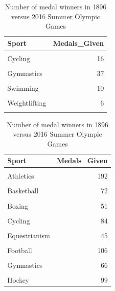 \documentclass[
]{article}
\begin{document}
\begin{table}
\centering\caption{\label{tab:SummerWinners}Number of medal winners in 1896 versus 2016 Summer Olympic Games}

\centering
\begin{tabular}[t]{lr}
\toprule
Sport & \vphantom{1} Medals\_Given\\
\midrule
\cellcolor{gray!10}{Athletics} & \cellcolor{gray!10}{37}\\
Cycling & 16\\
\cellcolor{gray!10}{Fencing} & \cellcolor{gray!10}{9}\\
Gymnastics & 37\\
\cellcolor{gray!10}{Shooting} & \cellcolor{gray!10}{15}\\
\addlinespace
Swimming & 10\\
\cellcolor{gray!10}{Tennis} & \cellcolor{gray!10}{10}\\
Weightlifting & 6\\
\cellcolor{gray!10}{Wrestling} & \cellcolor{gray!10}{3}\\
\bottomrule
\end{tabular}
\centering
\begin{tabular}[t]{lr}
\toprule
Sport & Medals\_Given\\
\midrule
\cellcolor{gray!10}{Archery} & \cellcolor{gray!10}{24}\\
Athletics & 192\\
\cellcolor{gray!10}{Badminton} & \cellcolor{gray!10}{24}\\
Basketball & 72\\
\cellcolor{gray!10}{Beach Volleyball} & \cellcolor{gray!10}{12}\\
\addlinespace
Boxing & 51\\
\cellcolor{gray!10}{Canoeing} & \cellcolor{gray!10}{82}\\
Cycling & 84\\
\cellcolor{gray!10}{Diving} & \cellcolor{gray!10}{36}\\
Equestrianism & 45\\
\addlinespace
\cellcolor{gray!10}{Fencing} & \cellcolor{gray!10}{65}\\
Football & 106\\
\cellcolor{gray!10}{Golf} & \cellcolor{gray!10}{6}\\
Gymnastics & 66\\
\cellcolor{gray!10}{Handball} & \cellcolor{gray!10}{89}\\
\addlinespace
Hockey & 99\\

\end{tabular}
\end{table}
\end{document}
